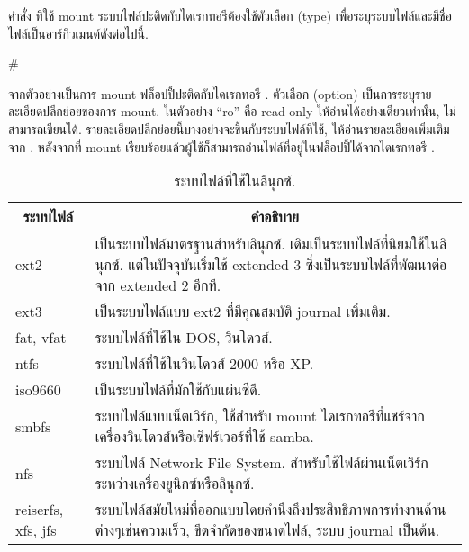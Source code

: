 \begin{thwbr}
คำสั่ง  ที่ใช้ mount ระบบไฟล์ปะติดกับไดเรกทอรีต้องใช้ตัวเลือก  (type) เพื่อระบุระบบไฟล์และมีชื่อไฟล์เป็นอาร์กิวเมนต์ดังต่อไปนี้.
\begin{MyExample}
\begin{MyEx}
# 
\end{MyEx}
\end{MyExample}
จากตัวอย่างเป็นการ mount ฟล็อปปี้ปะติดกับไดเรกทอรี . ตัวเลือก  (option) เป็นการระบุรายละเอียดปลีกย่อยของการ mount. ในตัวอย่าง ``ro'' คือ read-only ให้อ่านได้อย่างเดียวเท่านั้น, ไม่สามารถเขียนได้. รายละเอียดปลีกย่อยนี้บางอย่างจะขึ้นกับระบบไฟล์ที่ใช้, ให้อ่านรายละเอียดเพิ่มเติมจาก . หลังจากที่ mount เรียบร้อยแล้วผู้ใช้ก็สามารถอ่านไฟล์ที่อยู่ในฟล็อปปี้ได้จากไดเรกทอรี . 

\begin{table}[!htb]
\caption{ระบบไฟล์ที่ใช้ในลินุกซ์.}\label{tab:filesystem}
\medskip
\begin{tabular}{lp{}}
\toprule
\multicolumn{1}{c}{ระบบไฟล์} & \multicolumn{1}{c}{คำอธิบาย}\\
\midrule
ext2 & เป็นระบบไฟล์มาตรฐานสำหรับลินุกซ์. เดิมเป็นระบบไฟล์ที่นิยมใช้ในลินุกซ์. แต่ในปัจจุบันเริ่มใช้ extended 3 ซึ่งเป็นระบบไฟล์ที่พัฒนาต่อจาก extended 2 อีกที.\\
ext3 & เป็นระบบไฟล์แบบ ext2 ที่มีคุณสมบัติ journal เพิ่มเติม.\\
fat, vfat & ระบบไฟล์ที่ใช้ใน DOS, วินโดวส์.\\
ntfs & ระบบไฟล์ที่ใช้ในวินโดวส์ 2000 หรือ XP.\\
iso9660 & เป็นระบบไฟล์ที่มักใช้กับแผ่นซีดี.\\
smbfs & ระบบไฟล์แบบเน็ตเวิร์ก, ใช้สำหรับ mount ไดเรกทอรีที่แชร์จากเครื่องวินโดวส์หรือเซิฟร์เวอร์ที่ใช้ samba.\\
nfs & ระบบไฟล์ Network File System. สำหรับใช้ไฟล์ผ่านเน็ตเวิร์กระหว่างเครื่องยูนิกซ์หรือลินุกซ์.\\
reiserfs, xfs, jfs & ระบบไฟล์สมัยใหม่ที่ออกแบบโดยคำนึงถึงประสิทธิภาพการทำงานด้านต่างๆเช่นความเร็ว, ขีดจำกัดของขนาดไฟล์, ระบบ journal เป็นต้น.\\
\bottomrule
\end{tabular}
\end{table}


\end{thwbr}
